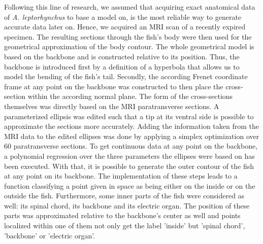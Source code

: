 Following this line of research, we assumed that acquiring exact anatomical data of \textit{A. leptorhynchus} to base a model on, is the most reliable way to generate accurate data later on. Hence, we acquired an MRI scan of a recently expired specimen. The resulting sections through the fish's body were then used for the geometrical approximation of the body contour. The whole geometrical model is based on the backbone and is constructed relative to its position. Thus, the backbone is introduced first by a definition of a hyperbola that allows us to model the bending of the fish's tail. Secondly, the according Frenet coordinate frame at any point on the backbone was constructed to then place the cross-section within the according normal plane. The form of the cross-sections themselves was directly based on the MRI paratransverse sections. A parameterized ellipsis was edited such that a tip at its ventral side is possible to approximate the sections more accurately. Adding the information taken from the MRI data to the edited ellipses was done by applying a simplex optimization over 60 paratransverse sections. To get continuous data at any point on the backbone, a polynomial regression over the three parameters the ellipses were based on has been executed. With that, it is possible to generate the outer contour of the fish at any point on its backbone. The implementation of these steps leads to a function classifying a point given in space as being either on the inside or on the outside the fish. Furthermore, some inner parts of the fish were considered as well: its spinal chord, its backbone and its electric organ. The position of these parts was approximated relative to the backbone's center as well and points localized within one of them not only get the label 'inside' but 'spinal chord', 'backbone' or 'electric organ'. 